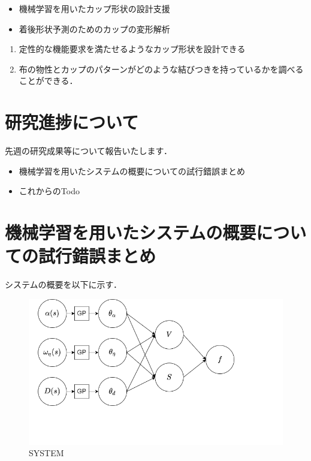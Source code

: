 \documentclass[11pt]{jsarticle}
\begin{document}
	\articleSPRabst
		\begin{itemize}
			\item 機械学習を用いたカップ形状の設計支援
			\item 着後形状予測のためのカップの変形解析
		\end{itemize}
		
		
	\articleSPRobj
		\begin{enumerate}
			\item 定性的な機能要求を満たせるようなカップ形状を設計できる
			\item 布の物性とカップのパターンがどのような結びつきを持っているかを調べることができる．
		\end{enumerate}
	\articleSPRitemsone
		
		\tableofcontents
		
		
	\articleSPRitemstwo
	\renewcommand{\labelitemi}{$\blacktriangledown$}
	\section{研究進捗について}
		先週の研究成果等について報告いたします．
		\begin{itemize}
			\item 機械学習を用いたシステムの概要についての試行錯誤まとめ
			\item これからのTodo
		\end{itemize}
	\section{機械学習を用いたシステムの概要についての試行錯誤まとめ}
		システムの概要を以下に示す．
		\begin{figure}[H]
			\centering
			\includegraphics[scale=0.5]{./figure/systems.png}
			\caption{SYSTEM}
		\end{figure}
\end{document}

